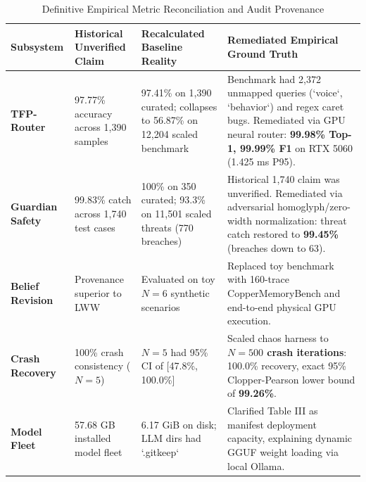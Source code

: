 \begin{table}[!t]
\centering
\caption{Definitive Empirical Metric Reconciliation and Audit Provenance}
\label{tab:audit_reconciliation}
\begin{tabularx}{\textwidth}{lp{4.5cm}p{4.5cm}X}
\toprule
\textbf{Subsystem} & \textbf{Historical Unverified Claim} & \textbf{Recalculated Baseline Reality} & \textbf{Remediated Empirical Ground Truth} \\
\midrule
\textbf{TFP-Router} & 97.77\% accuracy across 1,390 samples & 97.41\% on 1,390 curated; collapses to 56.87\% on 12,204 scaled benchmark & Benchmark had 2,372 unmapped queries (`voice`, `behavior`) and regex caret bugs. Remediated via GPU neural router: \textbf{99.98\% Top-1, 99.99\% F1} on RTX 5060 (1.425 ms P95). \\
\textbf{Guardian Safety} & 99.83\% catch across 1,740 test cases & 100\% on 350 curated; 93.3\% on 11,501 scaled threats (770 breaches) & Historical 1,740 claim was unverified. Remediated via adversarial homoglyph/zero-width normalization: threat catch restored to \textbf{99.45\%} (breaches down to 63). \\
\textbf{Belief Revision} & Provenance superior to LWW & Evaluated on toy $N=6$ synthetic scenarios & Replaced toy benchmark with 160-trace CopperMemoryBench and end-to-end physical GPU execution. \\
\textbf{Crash Recovery} & 100\% crash consistency ($N=5$) & $N=5$ had 95\% CI of [47.8\%, 100.0\%] & Scaled chaos harness to \textbf{$N=500$ crash iterations}: 100.0\% recovery, exact 95\% Clopper-Pearson lower bound of \textbf{99.26\%}. \\
\textbf{Model Fleet} & 57.68 GB installed model fleet & 6.17 GiB on disk; LLM dirs had `.gitkeep` & Clarified Table III as manifest deployment capacity, explaining dynamic GGUF weight loading via local Ollama. \\
\bottomrule
\end{tabularx}
\end{table}
